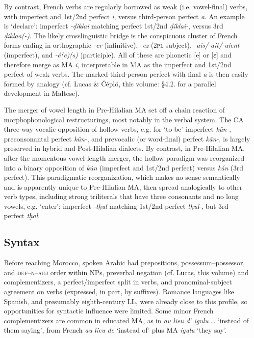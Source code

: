 \documentclass[output=paper]{langsci/langscibook}
\begin{document}
By contrast, French verbs are regularly borrowed as weak (i.e. vowel-final) verbs, with imperfect and 1st/2nd perfect \textit{i}, versus third-person perfect \textit{a}. An example is ‘declare’: imperfect \textit{\nobreakdash-ḍikla{\R}i} matching perfect 1st/2nd \textit{ḍikla{\R}i-}, versus 3rd \textit{ḍikla{\R}a(-)}. The likely crosslinguistic bridge is the conspicuous cluster of French forms ending in orthographic \textit{{}-er} (infinitive), \textit{{}-ez} (2\textsc{pl} subject), \textit{{}-ais/-ait/-aient} (imperfect), and \textit{-é(e)(s)} (participle). All of these are phonetic [e] or [ɛ] and therefore merge as MA \textit{i}, interpretable in MA as the imperfect and 1st/2nd perfect of weak verbs. The marked third-person perfect with final \textit{a} is then easily formed by analogy  (cf. Lucas \& Čéplö, this volume: §4.2. for a parallel development in Maltese).

The merger of vowel length in Pre-Hilalian MA set off a chain reaction of morphophonological restructurings, most notably in the verbal system. The CA three-way vocalic opposition of hollow verbs, e.g. for ‘to be’ imperfect \textit{kūn-}, preconsonantal perfect \textit{kŭn-}, and prevocalic (or word-final) perfect \textit{kān-}, is largely preserved in hybrid and Post-Hilalian dialects. By contrast, in Pre-Hilalian MA, after the momentous vowel-length merger, the hollow paradigm was reorganized into a binary opposition of \textit{kún} (imperfect and 1st/2nd perfect) versus \textit{kán} (3rd perfect). This paradigmatic reorganization, which makes no sense semantically and is apparently unique to Pre-Hilalian MA, then spread analogically to other verb types, including strong triliterals that have three consonants and no long vowels, e.g. ‘enter’: imperfect \textit{-tḫul} matching 1st/2nd perfect \textit{tḫul-}, but 3rd perfect \textit{tḫal}.

\subsection{Syntax}

Before reaching Morocco, spoken Arabic had prepositions, possessum--possessor, and \textsc{def--n--adj} order within NPs, preverbal negation (cf. Lucas, this volume) and complementizers, a perfect/imperfect split in verbs, and pronominal-subject agreement on verbs (expressed, in part, by suffixes). Romance languages like Spanish, and presumably eighth-century LL, were already close to this profile, so opportunities for syntactic influence were limited. Some minor French complementizers are common in educated MA, as in \textit{au} \textit{lieu} \textit{d’} \textit{igulu} … ‘instead of them saying’, from French \textit{au} \textit{lieu} \textit{de} ‘instead of’ plus MA \textit{igulu} ‘they say’. 
\end{document}
